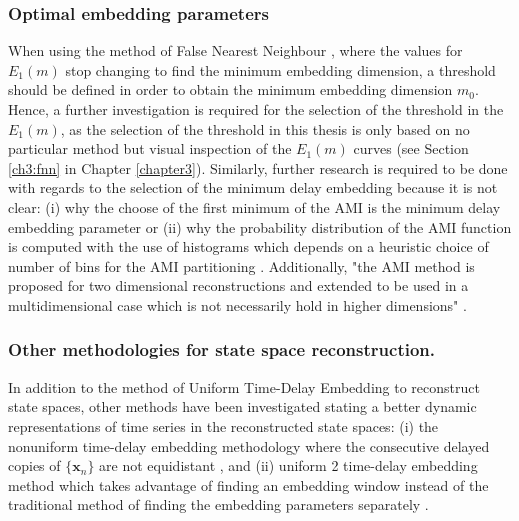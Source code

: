 \subsubsection*{Optimal embedding parameters}
When using the method of False Nearest Neighbour \citep{Cao1997}, where 
the values for $E_1(m)$ stop changing to find the minimum embedding 
dimension, a threshold should be defined in order to obtain the minimum 
embedding dimension $m_0$. Hence, a further investigation is required 
for the selection of the threshold in the $E_1(m)$, as the selection 
of the threshold in this thesis is only based on no particular method 
but visual inspection of the $E_1(m)$ curves
(see Section \ref{ch3:fnn} in Chapter \ref{chapter3}).
Similarly, further research is required to be done with regards to the 
selection of the minimum delay embedding because it is not clear:
(i) why the choose of the first minimum of the AMI is the minimum delay 
embedding parameter \citep{kantz2003} or 
(ii) why the probability distribution of the AMI function 
is computed with the use of histograms which depends on a heuristic 
choice of number of bins for the AMI partitioning \citep{garcia2005e71}. 
Additionally, "the AMI method is proposed for two dimensional 
reconstructions and extended to be used in a multidimensional case 
which is not necessarily hold in higher dimensions" 
\citep[p. 156]{gomezgarcia2014}.


\subsubsection*{Other methodologies for state space reconstruction.}
In addition to the method of Uniform Time-Delay Embedding to reconstruct
state spaces, other methods have been investigated stating a better 
dynamic representations of time series in the reconstructed state spaces:
(i) the nonuniform time-delay embedding methodology  
where the consecutive delayed copies of $\{ \boldsymbol{x}_n  \} $ are not
equidistant
\citep{pecora2007, uzal2011, 
Quintana-Duque2012, Quintana-Duque2013, Quintana-Duque2016}, and
(ii) uniform 2 time-delay embedding method which takes advantage 
of finding an embedding window instead of the traditional method 
of finding the embedding parameters separately \citep{gomezgarcia2014}.


